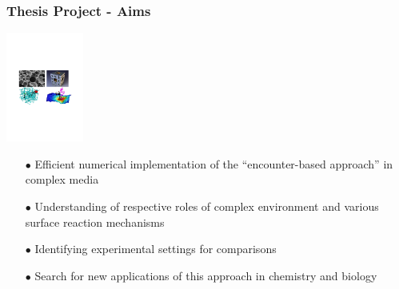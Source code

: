 \documentclass[9pt]{beamer}
\newcommand{\mrm}{\mathrm}
\newcommand{\tbf}{\textbf}
\begin{document}
\begin{frame}[fragile]
	\frametitle{\tbf{Thesis Project - Aims} 
	}

	
	\large

  \begin{center}
  \includegraphics[height=3.6cm]{figs/PhD_project_final_figs.pdf}
  \end{center}



\begin{itemize}
  	\setlength{\itemsep}{8pt}
  \item[$\bullet$] Efficient numerical implementation of the ``encounter-based approach'' in complex media
  \item[$\bullet$] Understanding of respective roles of complex environment and various surface reaction mechanisms
  \item[$\bullet$] Identifying experimental settings for comparisons
  \item[$\bullet$] Search for new applications of this approach in chemistry and biology
\end{itemize}
  
  
  
\end{frame}
\end{document}
